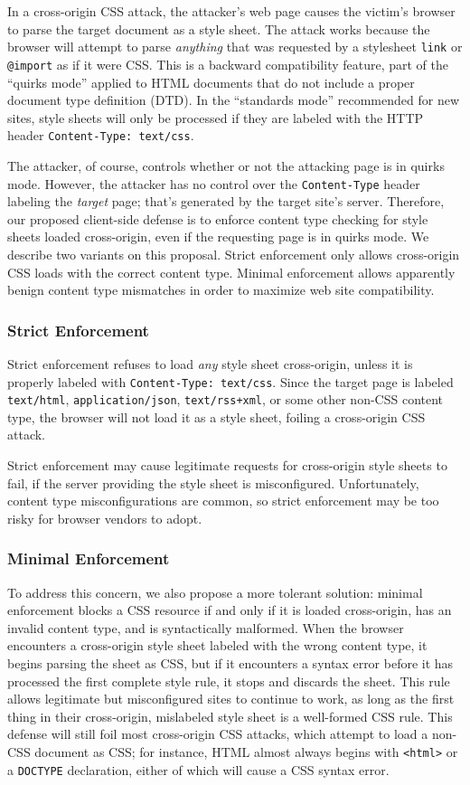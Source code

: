 \documentclass{acm_proc_article-sp}
\begin{document}
In a cross-origin CSS attack, the attacker’s web page causes the
victim’s browser to parse the target document as a style sheet.  The
attack works because the browser will attempt to parse \emph{anything}
that was requested by a stylesheet \verb|link| or \verb|@import| as if
it were CSS. This is a backward compatibility feature, part of the
“quirks mode” applied to HTML documents that do not include a proper
document type definition (DTD). In the “standards mode” recommended
for new sites, style sheets will only be processed if they are labeled
with the HTTP header \verb|Content-Type: text/css|.

The attacker, of course, controls whether or not the attacking page is
in quirks mode. However, the attacker has no control over the
\texttt{Content-Type} header labeling the \emph{target} page; that's
generated by the target site's server. Therefore, our proposed
client-side defense is to enforce content type checking for style
sheets loaded cross-origin, even if the requesting page is in quirks
mode. We describe two variants on this proposal.  Strict enforcement
only allows cross-origin CSS loads with the correct content type.
Minimal enforcement allows apparently benign content type mismatches
in order to maximize web site compatibility.

\subsubsection{Strict Enforcement} \label{sec:strict}
Strict enforcement refuses to load \emph{any} style sheet
cross-origin, unless it is properly labeled with
\verb|Content-Type: text/css|. Since the target page is labeled
\verb|text/html|, \texttt{application\slash{}json},
\verb|text/rss+xml|, or some other non-CSS content type, the browser
will not load it as a style sheet, foiling a cross-origin CSS attack.

Strict enforcement may cause legitimate requests for cross-origin
style sheets to fail, if the server providing the style sheet is
misconfigured.  Unfortunately, content type misconfigurations are
common, so strict enforcement may be too risky for browser vendors to
adopt.

\subsubsection{Minimal Enforcement}
To address this concern, we also propose a more tolerant solution:
minimal enforcement blocks a CSS resource if and only if it is loaded
cross-origin, has an invalid content type, and is syntactically
malformed. When the browser encounters a cross-origin style sheet
labeled with the wrong content type, it begins parsing the sheet as
CSS, but if it encounters a syntax error before it has processed the
first complete style rule, it stops and discards the sheet. This rule
allows legitimate but misconfigured sites to continue to work, as long
as the first thing in their cross-origin, mislabeled style sheet is a
well-formed CSS rule. This defense will still foil most cross-origin
CSS attacks, which attempt to load a non-CSS document as CSS; for
instance, HTML almost always begins with \verb|<html>| or a
\verb|DOCTYPE| declaration, either of which will cause a CSS syntax
error.
\end{document}
